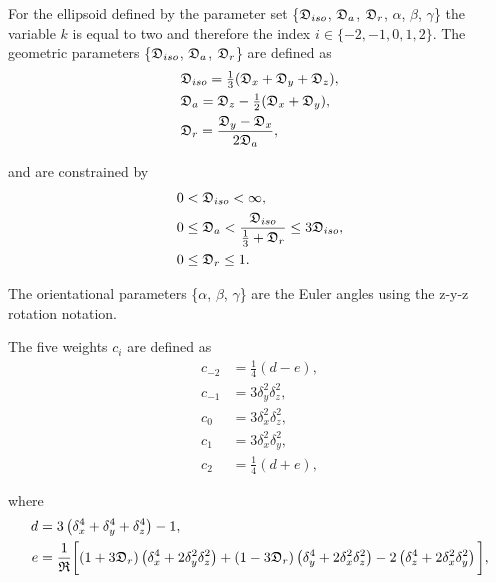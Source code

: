 For the ellipsoid defined by the parameter set \{$\mathfrak{D}_{iso}$, $\mathfrak{D}_a$, $\mathfrak{D}_r$, $\alpha$, $\beta$, $\gamma$\} the variable $k$ is equal to two and therefore the index $i \in \{-2, -1, 0, 1, 2\}$.
The geometric parameters \{$\mathfrak{D}_{iso}$, $\mathfrak{D}_a$, $\mathfrak{D}_r$\} are defined as
\begin{subequations}
\begin{align}
    & \mathfrak{D}_{iso} = \tfrac{1}{3} (\mathfrak{D}_x + \mathfrak{D}_y + \mathfrak{D}_z ),   \label{eq: Diso ellipsoid def} \\
    & \mathfrak{D}_a = \mathfrak{D}_z - \tfrac{1}{2}(\mathfrak{D}_x + \mathfrak{D}_y),         \label{eq: Da ellipsoid def} \\
    & \mathfrak{D}_r = \frac{\mathfrak{D}_y - \mathfrak{D}_x}{2\mathfrak{D}_a},                \label{eq: Dr ellipsoid def}
\end{align}
\end{subequations}

\noindent and are constrained by
\begin{subequations}
\begin{align}
    0 & < \mathfrak{D}_{iso} < \infty,                                                    \label{eq: Diso lim} \\
    0 & \le \mathfrak{D}_a < \frac{\mathfrak{D}_{iso}}{\tfrac{1}{3} + \mathfrak{D}_r} \le 3\mathfrak{D}_{iso}, \label{eq: Da lim} \\
    0 & \le \mathfrak{D}_r \le 1.                                                         \label{eq: Dr lim}
\end{align}
\end{subequations}

\noindent The orientational parameters \{$\alpha$, $\beta$, $\gamma$\} are the Euler angles using the z-y-z rotation notation.


The five weights $c_i$ are defined as
\begin{subequations}
\begin{align}
    c_{-2} &= \tfrac{1}{4}(d - e),     \label{eq: ellipsoid c-2} \\
    c_{-1} &= 3\delta_y^2\delta_z^2,   \label{eq: ellipsoid c-1} \\
    c_{0}  &= 3\delta_x^2\delta_z^2,   \label{eq: ellipsoid c0} \\
    c_{1}  &= 3\delta_x^2\delta_y^2,   \label{eq: ellipsoid c1} \\
    c_{2}  &= \tfrac{1}{4}(d + e),     \label{eq: ellipsoid c2}
\end{align}
\end{subequations}

\noindent where
\begin{align}
    d &= 3 \left( \delta_x^4 + \delta_y^4 + \delta_z^4 \right) - 1, \label{eq: ellipsoid d} \\
    e &= \frac{1}{\mathfrak{R}} \bigg[ (1 + 3\mathfrak{D}_r) \left(\delta_x^4 + 2\delta_y^2\delta_z^2\right)
        + (1 - 3\mathfrak{D}_r) \left(\delta_y^4 + 2\delta_x^2\delta_z^2\right) - 2 \left(\delta_z^4 + 2\delta_x^2\delta_y^2\right) \bigg], \label{eq: ellipsoid e}
\end{align}

